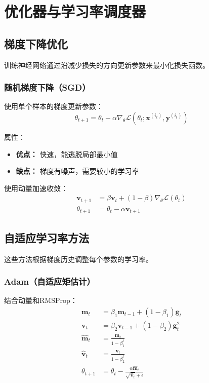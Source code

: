 %

\clearpage
\cleardoublepage

\chapter{优化器与学习率调度器}

\section{梯度下降优化}

训练神经网络通过沿减少损失的方向更新参数来最小化损失函数。

\subsection{随机梯度下降（SGD）}

使用单个样本的梯度更新参数：
\begin{equation}
\theta_{t+1} = \theta_t - \alpha \nabla_\theta \mathcal{L}(\theta_t; \mathbf{x}^{(i_t)}, \mathbf{y}^{(i_t)})
\end{equation}

属性：
\begin{itemize}
    \item \textbf{优点：} 快速，能逃脱局部最小值
    \item \textbf{缺点：} 梯度有噪声，需要较小的学习率
\end{itemize}

使用动量加速收敛：
\begin{align}
\mathbf{v}_{t+1} &= \beta \mathbf{v}_t + (1-\beta)\nabla_\theta \mathcal{L}(\theta_t) \\
\theta_{t+1} &= \theta_t - \alpha \mathbf{v}_{t+1}
\end{align}

\section{自适应学习率方法}

这些方法根据梯度历史调整每个参数的学习率。

\subsection{Adam（自适应矩估计）}

结合动量和RMSProp：
\begin{align}
\mathbf{m}_t &= \beta_1 \mathbf{m}_{t-1} + (1-\beta_1)\mathbf{g}_t \\
\mathbf{v}_t &= \beta_2 \mathbf{v}_{t-1} + (1-\beta_2)\mathbf{g}_t^2 \\
\hat{\mathbf{m}}_t &= \frac{\mathbf{m}_t}{1-\beta_1^t} \\
\hat{\mathbf{v}}_t &= \frac{\mathbf{v}_t}{1-\beta_2^t} \\
\theta_{t+1} &= \theta_t - \frac{\alpha \hat{\mathbf{m}}_t}{\sqrt{\hat{\mathbf{v}}_t} + \epsilon}
\end{align}


